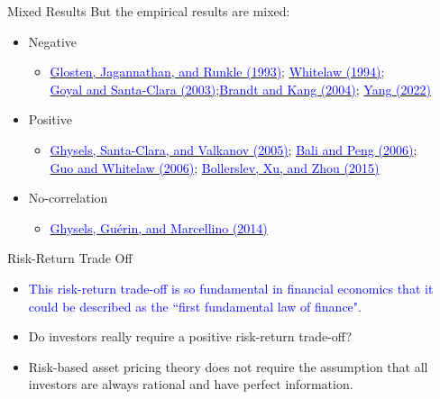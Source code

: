 \documentclass{beamer}
\begin{document}
\begin{frame}{Mixed Results}
	But the empirical results are mixed:
	\begin{itemize}
		\item Negative
		\begin{itemize}
			\item \href{https://doi.org/10.1111/j.1540-6261.1993.tb05128.x}{\textcolor{blue}{Glosten, Jagannathan, and Runkle (1993)}}; \href{https://doi.org/10.1111/j.1540-6261.1994.tb05150.x}{\textcolor{blue}{Whitelaw (1994)}}; \\ \href{https://doi.org/10.1111/1540-6261.00555}{\textcolor{blue}{Goyal and Santa‐Clara (2003)}};\href{https://doi.org/10.1016/j.jfineco.2002.06.001}{\textcolor{blue}{Brandt and Kang (2004)}}; \href{https://www.ssrn.com/abstract=4116731}{\textcolor{blue}{Yang (2022)}}
		\end{itemize}
		\item Positive
		\begin{itemize}
			\item \href{https://doi.org/10.1016/j.jfineco.2004.03.008}{\textcolor{blue}{Ghysels, Santa-Clara, and Valkanov (2005)}}; \href{https://doi.org/10.1002/jae.911}{\textcolor{blue}{Bali and Peng (2006)}}; \\
			\href{https://doi.org/10.1111/j.1540-6261.2006.00877.x}{\textcolor{blue}{Guo and Whitelaw (2006)}}; \href{https://doi.org/10.1016/j.jeconom.2015.02.031}{\textcolor{blue}{Bollerslev, Xu, and Zhou (2015)}}
		\end{itemize}
		\item No-correlation
		\begin{itemize}
			\item \href{https://doi.org/10.1016/j.jempfin.2014.06.007}{\textcolor{blue}{Ghysels, Guérin, and Marcellino (2014)}}
		\end{itemize}
	\end{itemize}
\end{frame}

\begin{frame}{Risk-Return Trade Off}
	\begin{itemize}
		\item \textcolor{blue}{This risk-return trade-off is so fundamental in financial economics that it could be described as the ``first fundamental law of finance".}
		\item Do investors really require a positive risk-return trade-off?
		\item Risk-based asset pricing theory does not require the assumption that all investors are always rational and have perfect information.
	\end{itemize}
\end{frame}
\end{document}
